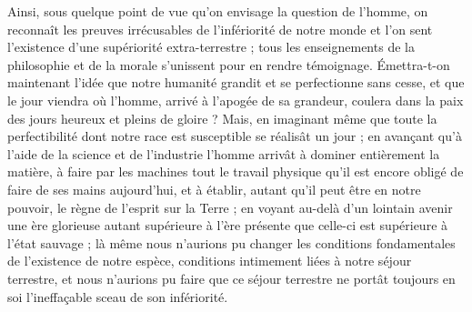 \documentclass[a4paper, 11pt, oneside, landscape]{article}
\begin{document}
Ainsi, sous quelque point de vue qu'on envisage la question de l'homme, on reconnaît les preuves irrécusables de l'infériorité de notre monde et l'on sent l'existence d'une supériorité extra-terrestre ; tous les enseignements de la philosophie et de la morale s'unissent pour en rendre témoignage. Émettra-t-on maintenant l'idée que notre humanité grandit et se perfectionne sans cesse, et que le jour viendra où l'homme, arrivé à l'apogée de sa grandeur, coulera dans la paix des jours heureux et pleins de gloire ? Mais, en imaginant même que toute la perfectibilité dont notre race est susceptible se réalisât un jour ; en avançant qu'à l'aide de la science et de l'industrie l'homme arrivât à dominer entièrement la matière, à faire par les machines tout le travail physique qu'il est encore obligé de faire de ses mains aujourd'hui, et à établir, autant qu'il peut être en notre pouvoir, le règne de l'esprit sur la Terre ; en voyant au-delà d'un lointain avenir une ère glorieuse autant supérieure à l'ère présente que celle-ci est supérieure à l'état sauvage ; là même nous n'aurions pu changer les conditions fondamentales de l'existence de notre espèce, conditions intimement liées à notre séjour terrestre, et nous n'aurions pu faire que ce séjour terrestre ne portât toujours en soi l'ineffaçable sceau de son infériorité.
\end{document}
